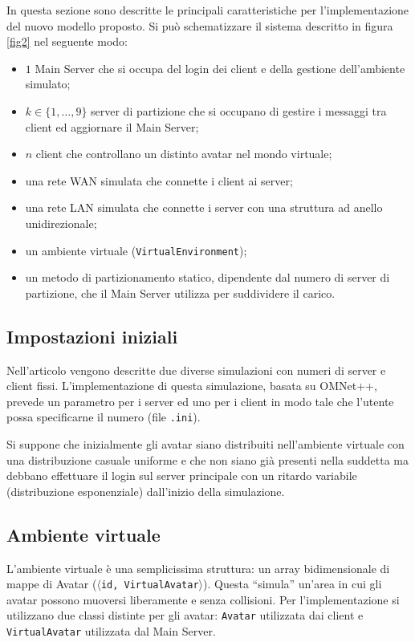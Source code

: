 \documentclass[a4paper, 11pt, oneside]{book}
\theoremstyle{definition}
\theoremstyle{remark}
\begin{document}
In questa sezione sono descritte le principali caratteristiche per
l'implementazione del nuovo modello proposto. Si può schematizzare il
sistema descritto in figura \ref{fig2} nel seguente modo:
\begin{itemize}
\item
$1$ Main Server che si occupa del login dei client e della gestione
dell'ambiente simulato;
\item
$k \in \{1, \ldots, 9\}$ server di partizione che si occupano di gestire i
messaggi tra client ed aggiornare il Main Server;
\item
$n$ client che controllano un distinto avatar nel mondo virtuale;
\item
una rete WAN simulata che connette i client ai server;
\item
una rete LAN simulata che connette i server con una struttura ad anello
unidirezionale;
\item
un ambiente virtuale (\texttt{VirtualEnvironment});
\item
un metodo di partizionamento statico, dipendente dal numero di server di
partizione, che il Main Server utilizza per suddividere il carico.
\end{itemize}

\subsection{Impostazioni iniziali}
Nell'articolo vengono descritte due diverse simulazioni con numeri di server
e client fissi. L'implementazione di questa simulazione, basata su OMNet++,
prevede un parametro per i server ed uno per i client in modo tale che l'utente
possa specificarne il numero (file \texttt{.ini}).

Si suppone che inizialmente gli avatar siano distribuiti nell'ambiente virtuale
con una distribuzione casuale uniforme e che non siano già presenti nella
suddetta ma debbano effettuare il login sul server principale con un ritardo
variabile (distribuzione esponenziale) dall'inizio della simulazione.

\subsection{Ambiente virtuale}
L'ambiente virtuale è una semplicissima struttura: un array
bidimensionale di mappe di Avatar
(\texttt{$\langle$id, VirtualAvatar$\rangle$}).
Questa ``simula'' un'area in cui gli avatar possono muoversi liberamente e
senza collisioni. Per l'implementazione si utilizzano due classi distinte
per gli avatar: \texttt{Avatar} utilizzata dai client e
\texttt{VirtualAvatar} utilizzata dal Main Server.
\end{document}
